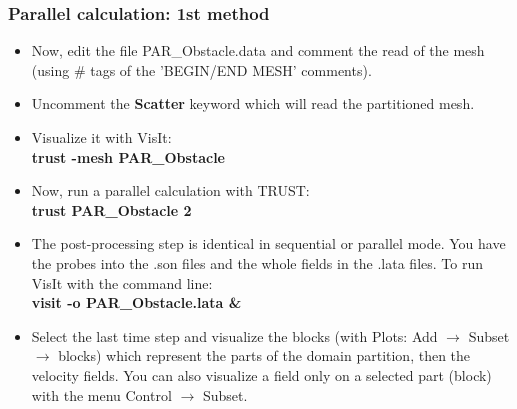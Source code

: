 \documentclass[10pt, hyperref={unicode=true,pdfusetitle, bookmarks=true,bookmarksnumbered=false,bookmarksopen=false, breaklinks=false,pdfborder={0 0 1},backref=true,colorlinks=true,linkcolor=darkblue,pageanchor}]{beamer}
\begin{document}
\begin{frame}
\frametitle{Parallel calculation: 1st method}
\begin{block}{}

\begin{itemize}
\item Now, edit the file PAR\_Obstacle.data and comment the read of the mesh
(using \# tags of the 'BEGIN/END MESH' comments).

\item Uncomment the \textbf{Scatter} keyword which will read the partitioned mesh. 

\item Visualize it with VisIt:\\
\textbf{trust -mesh PAR\_Obstacle}

\item Now, run a parallel calculation with TRUST:\\
\textbf{trust PAR\_Obstacle 2}

\item The post-processing step is identical in sequential or parallel mode. You have the
probes into the .son files and the whole fields in the .lata files. To run VisIt with the
command line:\\
\textbf{visit -o PAR\_Obstacle.lata \&}

\item Select the last time step and visualize the blocks (with Plots: Add $\rightarrow$ Subset $\rightarrow$ blocks)
which represent the parts of the domain partition, then the velocity fields. You can
also visualize a field only on a selected part (block) with the menu Control $\rightarrow$ Subset.
\end{itemize}

\end{block}
\end{frame}
\end{document}
